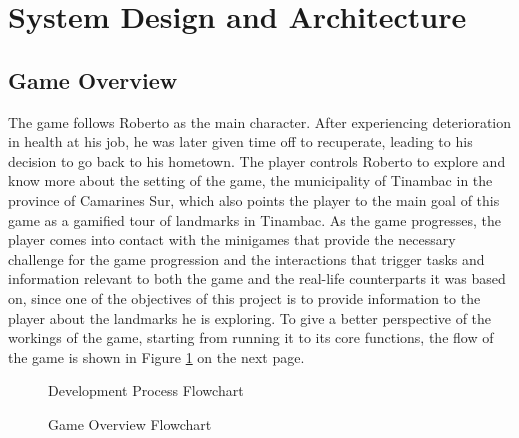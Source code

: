 \documentclass{research}
\begin{document}
\section{System Design and Architecture}

\subsection{Game Overview}

The game follows Roberto as the main character. After experiencing deterioration in
health at his job, he was later given time off to recuperate, leading to his decision
to go back to his hometown. The player controls Roberto to explore and know more about
the setting of the game, the municipality of Tinambac in the province of Camarines Sur,
which also points the player to the main goal of this game as a gamified tour of
landmarks in Tinambac. As the game progresses, the player comes into contact with the
minigames that provide the necessary challenge for the game progression and the
interactions that trigger tasks and information relevant to both the game and the
real-life counterparts it was based on, since one of the objectives of this project is
to provide information to the player about the landmarks he is exploring. To give a
better perspective of the workings of the game, starting from running it to its core
functions, the flow of the game is shown in Figure \ref{fig:dev_process} on the next
page.

\begin{figure}[h!]
  \centering
  \caption{Development Process Flowchart}
  \label{fig:dev_process}
\end{figure}

\begin{figure}[h!]
  \centering
  \caption{Game Overview Flowchart}
  \label{fig:game_overview}
\end{figure}
\end{document}
